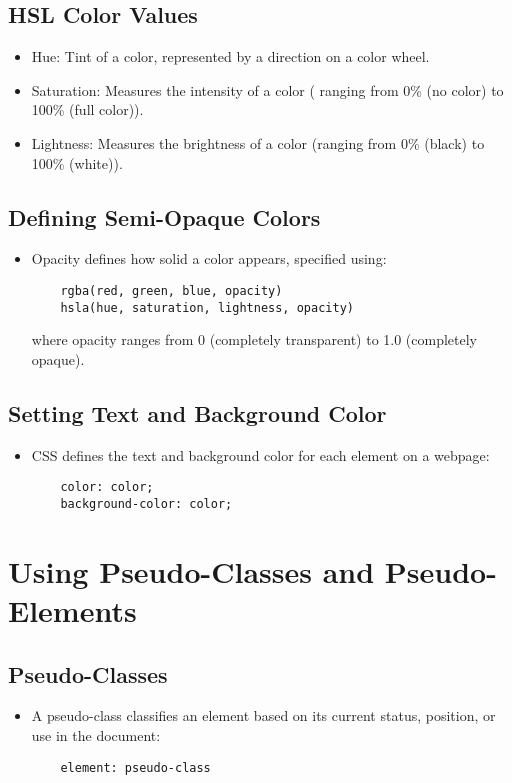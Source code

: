 \documentclass{article}
\begin{document}
\subsection{HSL Color Values}
\begin{itemize}
    \item Hue: Tint of a color, represented by a direction on a color wheel.
    \item Saturation: Measures the intensity of a color ( ranging from 0\% (no color) to 100\% (full color)).
    \item Lightness: Measures the brightness of a color (ranging from 0\% (black) to 100\% (white)).
\end{itemize}

\subsection{Defining Semi-Opaque Colors}
\begin{itemize}
    \item Opacity defines how solid a color appears, specified using:
    \begin{lstlisting}
    rgba(red, green, blue, opacity)
    hsla(hue, saturation, lightness, opacity)
    \end{lstlisting}
    where opacity ranges from 0 (completely transparent) to 1.0 (completely opaque).
\end{itemize}

\subsection{Setting Text and Background Color}
\begin{itemize}
    \item CSS defines the text and background color for each element on a webpage:
    \begin{lstlisting}
    color: color;
    background-color: color;
    \end{lstlisting}
\end{itemize}

\section{Using Pseudo-Classes and Pseudo-Elements}
\subsection{Pseudo-Classes}
\begin{itemize}
    \item A pseudo-class classifies an element based on its current status, position, or use in the document:
    \begin{lstlisting}
    element: pseudo-class
    \end{lstlisting}
\end{itemize}
\end{document}
